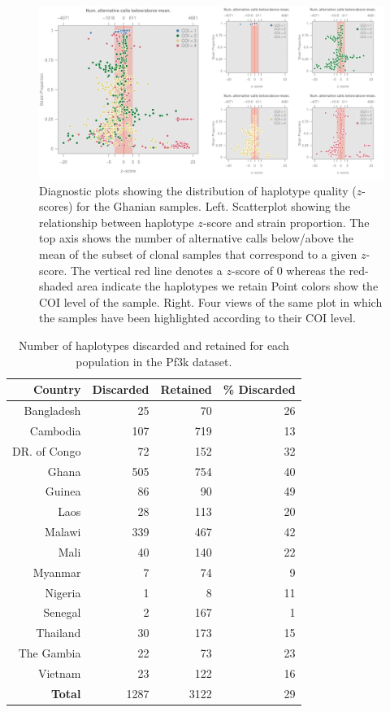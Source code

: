 \documentclass[9pt,lineno]{elife}
\begin{document}
\begin{figure}[ht]
  \centering
    \includegraphics[width=1\textwidth]{figures/qualityGhana.pdf}
  \caption{Diagnostic plots showing the distribution of haplotype quality ($z$-scores) for the Ghanian samples. Left. Scatterplot showing the relationship between haplotype $z$-score and strain proportion. The top axis shows the number of alternative calls below/above the mean of the subset of clonal samples that correspond to a given $z$-score. The vertical red line denotes a $z$-score of $0$ whereas the red-shaded area indicate the haplotypes we retain Point colors show the COI level of the sample. Right. Four views of the same plot in which the samples have been highlighted according to their COI level.}
    \label{fig:ghana-filtering}
\end{figure}



\begin{table}[ht]
\centering
\begin{tabular}{r|r|r|r}
\textbf{Country}  & \textbf{Discarded} & \textbf{Retained} &\textbf{ \% Discarded} \\
\hline
Bangladesh & 25 & 70 & 26 \\
Cambodia & 107 & 719 & 13 \\
DR. of Congo & 72 & 152 & 32 \\
Ghana & 505 & 754 & 40 \\
Guinea & 86 & 90 & 49 \\
Laos & 28 & 113 & 20 \\
Malawi & 339 & 467 & 42 \\
Mali & 40 & 140 & 22 \\
Myanmar & 7 & 74 & 9 \\
Nigeria & 1 & 8 & 11\\
Senegal & 2 & 167 & 1\\
Thailand & 30 & 173 & 15 \\
The Gambia & 22 & 73 & 23 \\
Vietnam & 23 & 122 & 16\\
\hline
\textbf{Total} & 1287 & 3122 & 29
\end{tabular}
\vspace{.2cm}
\caption{Number of haplotypes discarded and retained for each population in the Pf3k dataset.}
\label{table:haps-discarded-by-country}
\end{table}
\end{document}
